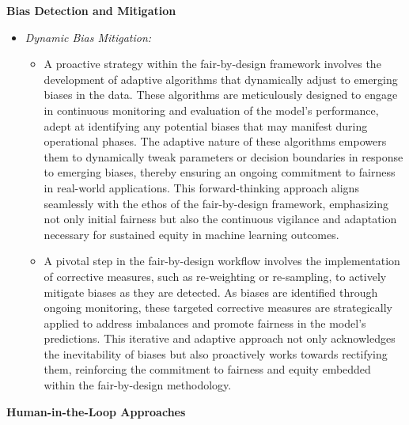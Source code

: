 \textbf{Bias Detection and Mitigation}

\begin{itemize}
    
    \item \emph{Dynamic Bias Mitigation:}
    
    \begin{itemize}
    
        \item A proactive strategy within the fair-by-design framework involves the development of adaptive algorithms that dynamically adjust to emerging biases in the data. These algorithms are meticulously designed to engage in continuous monitoring and evaluation of the model's performance, adept at identifying any potential biases that may manifest during operational phases. The adaptive nature of these algorithms empowers them to dynamically tweak parameters or decision boundaries in response to emerging biases, thereby ensuring an ongoing commitment to fairness in real-world applications. This forward-thinking approach aligns seamlessly with the ethos of the fair-by-design framework, emphasizing not only initial fairness but also the continuous vigilance and adaptation necessary for sustained equity in machine learning outcomes.

        \item A pivotal step in the fair-by-design workflow involves the implementation of corrective measures, such as re-weighting or re-sampling, to actively mitigate biases as they are detected. As biases are identified through ongoing monitoring, these targeted corrective measures are strategically applied to address imbalances and promote fairness in the model's predictions. This iterative and adaptive approach not only acknowledges the inevitability of biases but also proactively works towards rectifying them, reinforcing the commitment to fairness and equity embedded within the fair-by-design methodology.

    \end{itemize}

\end{itemize}

\textbf{Human-in-the-Loop Approaches}

